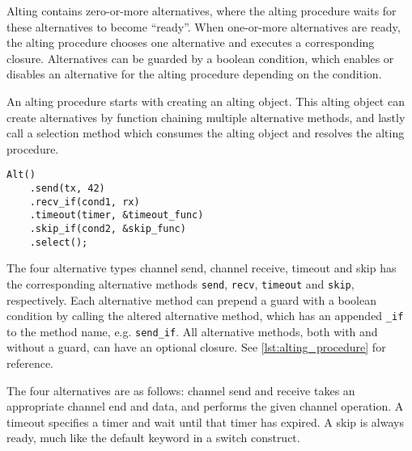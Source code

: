 Alting contains zero\hyp{}or\hyp{}more alternatives, where the alting procedure waits for these alternatives to become ``ready''. When one\hyp{}or\hyp{}more alternatives are ready, the alting procedure chooses one alternative and executes a corresponding closure. Alternatives can be guarded by a boolean condition, which enables or disables an alternative for the alting procedure depending on the condition.

An alting procedure starts with creating an alting object. This alting object can create alternatives by function chaining multiple alternative methods, and lastly call a selection method which consumes the alting object and resolves the alting procedure.

\begin{lstfloat}
\begin{lstlisting}[caption={Example of the alting construct.}, label={lst:alting_procedure}, style={CustomC++}]
Alt()
    .send(tx, 42)
    .recv_if(cond1, rx)
    .timeout(timer, &timeout_func)
    .skip_if(cond2, &skip_func)
    .select();
\end{lstlisting}
\end{lstfloat}

The four alternative types channel send, channel receive, timeout and skip has the corresponding alternative methods \lstinline[style={CustomC++}]|send|, \lstinline[style={CustomC++}]|recv|, \lstinline[style={CustomC++}]|timeout| and \lstinline[style={CustomC++}]|skip|, respectively. Each alternative method can prepend a guard with a boolean condition by calling the altered alternative method, which has an appended \lstinline[style={CustomC++}]|_if| to the method name, e.g. \lstinline[style={CustomC++}]|send_if|. All alternative methods, both with and without a guard, can have an optional closure. See \cref{lst:alting_procedure} for reference.

The four alternatives are as follows: channel send and receive takes an appropriate channel end and data, and performs the given channel operation. A timeout specifies a timer and wait until that timer has expired. A skip is always ready, much like the default keyword in a switch construct. 
